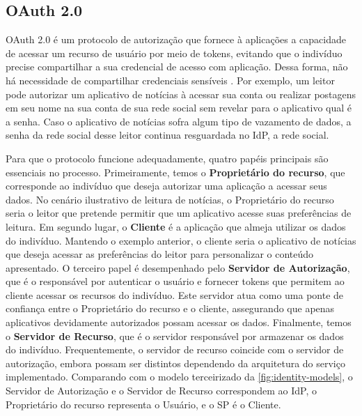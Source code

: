 \subsection{OAuth 2.0}\label{subsubsection:oauth}

OAuth 2.0 é um protocolo  de autorização que fornece à aplicações a capacidade de acessar um recurso de usuário por meio de tokens, evitando que o indivíduo precise compartilhar a sua credencial de acesso com aplicação. Dessa forma, não há necessidade de compartilhar credenciais sensíveis \cite{oauth}. Por exemplo, um leitor pode autorizar um aplicativo de notícias à acessar sua conta ou realizar postagens em seu nome na sua conta de sua rede social sem revelar para o aplicativo qual é a senha. Caso o aplicativo de notícias sofra algum tipo de vazamento de dados, a senha da rede social desse leitor continua resguardada no \acs{IdP}, a rede social.

Para que o protocolo funcione adequadamente, quatro papéis principais são essenciais no processo. Primeiramente, temos o \textbf{Proprietário do recurso}, que corresponde ao indivíduo que deseja autorizar uma aplicação a acessar seus dados. No cenário ilustrativo de leitura de notícias, o Proprietário do recurso seria o leitor que pretende permitir que um aplicativo acesse suas preferências de leitura. Em segundo lugar, o \textbf{Cliente} é a aplicação que almeja utilizar os dados do indivíduo. Mantendo o exemplo anterior, o cliente seria o aplicativo de notícias que deseja acessar as preferências do leitor para personalizar o conteúdo apresentado. O terceiro papel é desempenhado pelo \textbf{Servidor de Autorização}, que é o responsável por autenticar o usuário e fornecer tokens que permitem ao cliente acessar os recursos do indivíduo. Este servidor atua como uma ponte de confiança entre o Proprietário do recurso e o cliente, assegurando que apenas aplicativos devidamente autorizados possam acessar os dados. Finalmente, temos o \textbf{Servidor de Recurso}, que é o servidor responsável por armazenar os dados do indivíduo. Frequentemente, o servidor de recurso coincide com o servidor de autorização, embora possam ser distintos dependendo da arquitetura do serviço implementado. Comparando com o modelo terceirizado da \autoref{fig:identity-models}, o Servidor de Autorização e o Servidor de Recurso correspondem ao \acs{IdP}, o Proprietário do recurso representa o Usuário, e o \acs{SP} é o Cliente.

